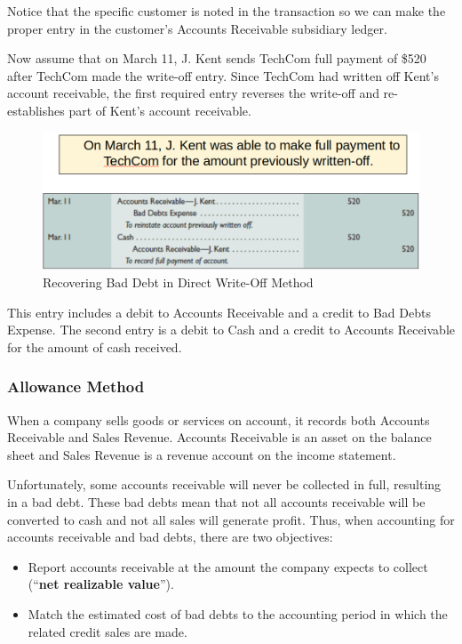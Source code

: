 \documentclass[../main.tex]{subfiles}
\begin{document}
	Notice that the specific customer is noted in the transaction so we can 
	make the proper entry in the customer’s Accounts Receivable subsidiary 
	ledger. 

	Now assume that on March 11, J. Kent sends TechCom full payment of \$520 
	after TechCom made the write-off entry. Since TechCom had written off 
	Kent’s account receivable, the first required entry reverses the write-off 
	and re-establishes part of Kent’s account receivable. 
	
	\begin{figure}[ht]
		\centering
		\includegraphics[width=\columnwidth]{images/c6/direct_writeoff_recovery.png}
		\caption{Recovering Bad Debt in Direct Write-Off Method}
	\end{figure}
	
	This entry includes a debit to Accounts Receivable and a credit to Bad 
	Debts Expense. The second entry is a debit to Cash and a credit to Accounts 
	Receivable for the amount of cash received.  

	\subsubsection{Allowance Method}
	
	When a company sells goods or services on account, it records both Accounts 
	Receivable and Sales Revenue. Accounts Receivable is an asset on the 
	balance sheet and Sales Revenue is a revenue account on the income 
	statement. 
	
	Unfortunately, some accounts receivable will never be collected in full, 
	resulting in a bad debt. These bad debts mean that not all accounts 
	receivable will be converted to cash and not all sales will generate 
	profit. Thus, when accounting for accounts receivable and bad debts, there 
	are two objectives:
	\begin{itemize}[noitemsep]
		\item Report accounts receivable at the amount the company expects to 
		collect (“\textbf{net realizable value}”).
		\item Match the estimated cost of bad debts to the accounting period in 
		which the related credit sales are made.
	\end{itemize}
	
\end{document}
